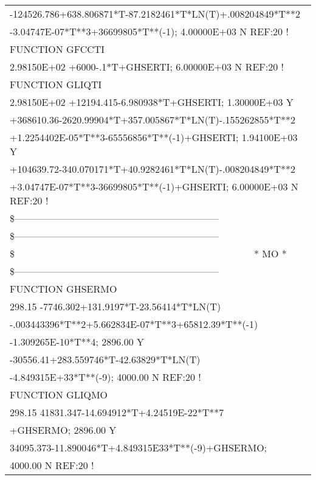 \begin{longtable}[H]{ l l l }
	\multicolumn{3}{l}{-124526.786+638.806871*T-87.2182461*T*LN(T)+.008204849*T**2}\\
	\multicolumn{3}{l}{-3.04747E-07*T**3+36699805*T**(-1);  4.00000E+03  N REF:20 !}\\
	FUNCTION GFCCTI & & \\
	\multicolumn{3}{l}{2.98150E+02  +6000-.1*T+GHSERTI;   6.00000E+03   N REF:20 !}\\
	FUNCTION GLIQTI & & \\
	\multicolumn{3}{l}{2.98150E+02  +12194.415-6.980938*T+GHSERTI; 1.30000E+03  Y}\\
	\multicolumn{3}{l}{+368610.36-2620.99904*T+357.005867*T*LN(T)-.155262855*T**2}\\
	\multicolumn{3}{l}{+1.2254402E-05*T**3-65556856*T**(-1)+GHSERTI;  1.94100E+03  Y}\\
	\multicolumn{3}{l}{+104639.72-340.070171*T+40.9282461*T*LN(T)-.008204849*T**2}\\
	\multicolumn{3}{l}{+3.04747E-07*T**3-36699805*T**(-1)+GHSERTI;  6.00000E+03  N REF:20 !}\\
	\multicolumn{3}{l}{\$---------------------------------------------------------------}\\
	\multicolumn{3}{l}{\$---------------------------------------------------------------}\\
	\$ & \multicolumn{2}{c}{* MO *}\\
	\multicolumn{3}{l}{\$---------------------------------------------------------------}\\
	FUNCTION GHSERMO & & \\
	\multicolumn{3}{l}{298.15 -7746.302+131.9197*T-23.56414*T*LN(T)}\\
	\multicolumn{3}{l}{-.003443396*T**2+5.662834E-07*T**3+65812.39*T**(-1)}\\
	\multicolumn{3}{l}{-1.309265E-10*T**4; 2896.00 Y}\\
	\multicolumn{3}{l}{-30556.41+283.559746*T-42.63829*T*LN(T)}\\
	\multicolumn{3}{l}{-4.849315E+33*T**(-9); 4000.00 N REF:20 !}\\
	FUNCTION GLIQMO & & \\
	\multicolumn{3}{l}{298.15 41831.347-14.694912*T+4.24519E-22*T**7}\\
	\multicolumn{3}{l}{+GHSERMO;   2896.00 Y}\\
	\multicolumn{3}{l}{34095.373-11.890046*T+4.849315E33*T**(-9)+GHSERMO;}\\
	\multicolumn{3}{l}{4000.00 N REF:20 !}\\

\end{longtable}

